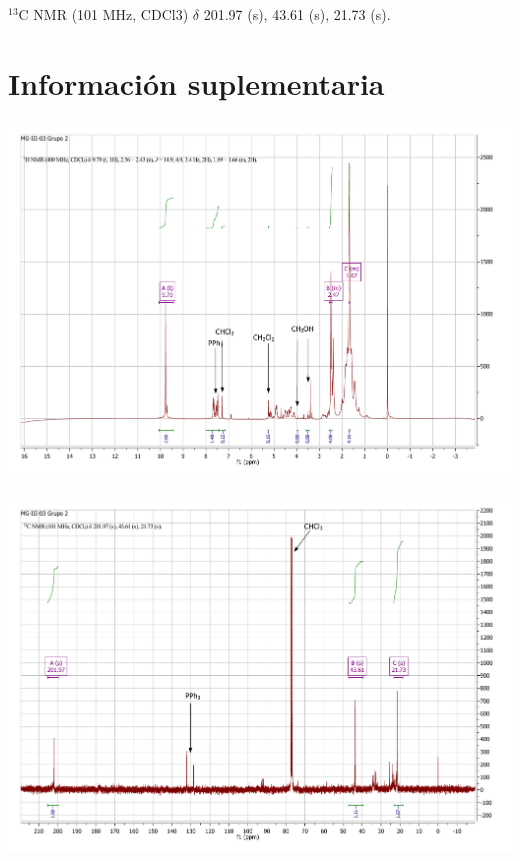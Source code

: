 \documentclass[fleqn,11pt]{SelfArx}
\begin{document}
$^{13}$C NMR (101 MHz, CDCl3) $\delta$ 201.97 (s), 43.61 (s), 21.73 (s).

{}



\onecolumn
\section{Informaci\'on suplementaria}\label{sec: complementaria}
{
	\begin{minipage}{0.9\textheight}
		\centering
		\includegraphics[height=0.7\textheight]{RMN/H.pdf}
		\label{HRMN}
	\end{minipage}
}

{
	\begin{minipage}{\textheight}
		\centering
		\includegraphics[height=0.7\textheight]{RMN/C.pdf}
		\label{CHRM}
	\end{minipage}
}
\end{document}
